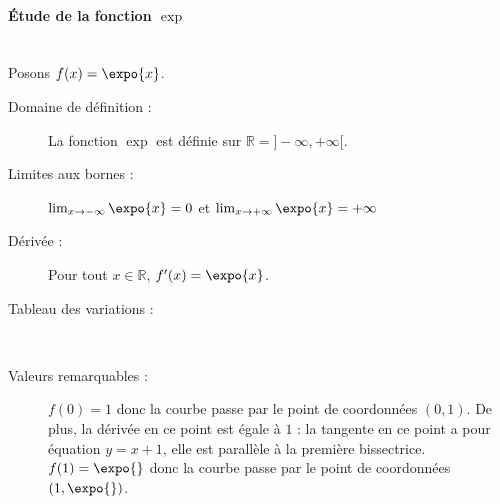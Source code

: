       \paragraph{\'Etude de la fonction $\exp$}~\\
      Posons $f(x) = \expo{x}$.
            \begin{description}
            \item[Domaine de d\'efinition :] La fonction $\exp$ est d\'efinie sur $\mathbb{R} = ]-\infty,+\infty[$.
            \item[Limites aux bornes :] $\lim_{x\rightarrow -\infty} \expo{x} = 0$ et 
                                        $\lim_{x\rightarrow +\infty} \expo{x} = +\infty$
            \item[D\'eriv\'ee :] Pour tout $x\in\mathbb{R}$, $f'(x) = \expo{x}$.
            \item[Tableau des variations :]~\\[-1\baselineskip]
                  \begin{table}[H]
                  \centering
                  \caption{Tableau des variations de la fonction exponentielle.}
                  \label{tab:variations expo}
                  \end{table}
            \item[Valeurs remarquables :] $f(0) = 1$ donc la courbe passe par le point de coordonn\'ees $(0,1)$.
                                          De plus, la d\'eriv\'ee en ce point est \'egale \`a $1$ :
                                          la tangente en ce point a pour \'equation $y = x + 1$,
                                          elle est parall\`ele \`a la premi\`ere bissectrice.
                                          $f(1) = \expo{}$ donc la courbe passe par le point de coordonn\'ees $(1,\expo{})$. 

\end{description}
